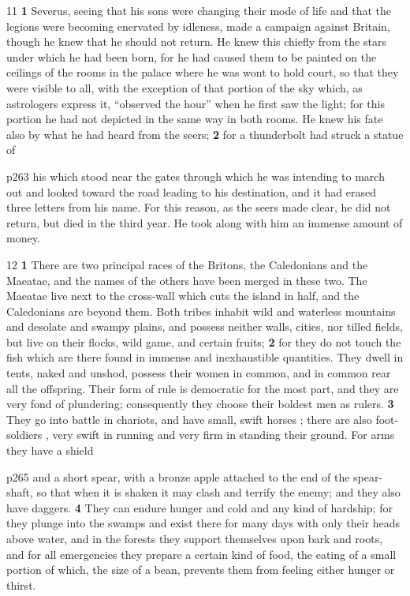11
\textbf{1} Severus, seeing that his sons were changing their mode of life and that the legions were becoming enervated by idleness, made a campaign against Britain, though he knew that he should not return. He knew this chiefly from the stars under which he had been born, for he had caused them to be painted on the ceilings of the rooms in the palace where he was wont to hold court, so that they were visible to all, with the exception of that portion of the sky which, as astrologers express it, ``observed the hour'' when he first saw the light; for this portion he had not depicted in the same way in both rooms. He knew his fate also by what he had heard from the seers; \textbf{2} for a thunderbolt had struck a statue of

p263 his which stood near the gates through which he was intending to march out and looked toward the road leading to his destination, and it had erased three letters from his name. For this reason, as the seers made clear, he did not return, but died in the third year. He took along with him an immense amount of money.

12
\textbf{1} There are two principal races of the Britons, the Caledonians and the Maeatae, and the names of the others have been merged in these two. The Maeatae live next to the cross-wall which cuts the island in half, and the Caledonians are beyond them. Both tribes inhabit wild and waterless mountains and desolate and swampy plains, and possess neither walls, cities, nor tilled fields, but live on their flocks, wild game, and certain fruits; \textbf{2} for they do not touch the fish which are there found in immense and inexhaustible quantities. They dwell in tents, naked and unshod, possess their women in common, and in common rear all the offspring. Their form of rule is democratic for the most part, and they are very fond of plundering; consequently they choose their boldest men as rulers. \textbf{3} They go into battle in chariots, and have small, swift horses ; there are also foot-soldiers , very swift in running and very firm in standing their ground. For arms they have a shield

p265 and a short spear, with a bronze apple attached to the end of the spear-shaft, so that when it is shaken it may clash and terrify the enemy; and they also have daggers. \textbf{4} They can endure hunger and cold and any kind of hardship; for they plunge into the swamps and exist there for many days with only their heads above water, and in the forests they support themselves upon bark and roots, and for all emergencies they prepare a certain kind of food, the eating of a small portion of which, the size of a bean, prevents them from feeling either hunger or thirst.

